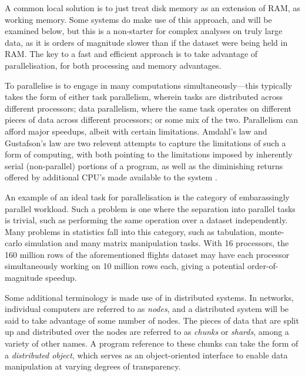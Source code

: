 A common local solution is to just treat disk memory as an extension of RAM, as working memory.
Some systems do make use of this approach, and will be examined below, but this is a non-starter for complex analyses on truly large data, as it is orders of magnitude slower than if the dataset were being held in RAM\cite{alpern1994memhierarchy}.
The key to a fast and efficient approach is to take advantage of parallelisation, for both processing and memory advantages.

To parallelise is to engage in many computations simultaneously---this typically takes the form of either task parallelism, wherein tasks are distributed across different processors; data parallelism, where the same task operates on different pieces of data across different processors; or some mix of the two\cite{subhlok1993exploiting}.
Parallelism can afford major speedups, albeit with certain limitations.
Amdahl's law and Gustafson's law are two relevent attempts to capture the limitations of such a form of computing, with both pointing to the limitations imposed by inherently serial (non-parallel) portions of a program, as well as the diminishing returns offered by additional CPU's made available to the system \cite{amdahl1967law}\cite{gustafson1988law}.

An example of an ideal task for parallelisation is the category of embarassingly parallel workload.
Such a problem is one where the separation into parallel tasks is trivial, such as performing the same operation over a dataset independently\cite{foster1995parallel}.
Many problems in statistics fall into this category, such as tabulation, monte-carlo simulation and many matrix manipulation tasks.
With 16 processors, the 160 million rows of the aforementioned flights dataset may have each processor simultaneously working on 10 million rows each, giving a potential order-of-magnitude speedup.

Some additional terminology is made use of in distributed systems.
In networks, individual computers are referred to as \textit{nodes}, and a distributed system will be said to take advantage of some number of nodes\cite{kleppmann2017dataintensive}.
The pieces of data that are split up and distributed over the nodes are referred to as \textit{chunks} or \textit{shards}, among a variety of other names.
A program reference to these chunks can take the form of a \textit{distributed object}, which serves as an object-oriented interface to enable data manipulation at varying degrees of transparency\cite{emmerich2000engineering}.

